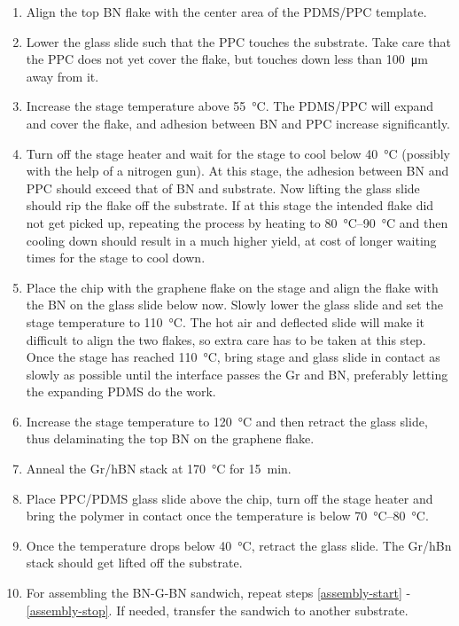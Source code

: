 \begin{enumerate}
	\item Align the top BN flake with the center area of the PDMS/PPC template.
	\item Lower the glass slide such that the PPC touches the substrate.
	Take care that the PPC does not yet cover the flake, but touches down less than \SI{100}{\micro\meter} away from it.
	\item Increase the stage temperature above \SI{55}{\celsius}.
	The PDMS/PPC will expand and cover the flake, and adhesion between BN and PPC increase significantly.
	\item Turn off the stage heater and wait for the stage to cool below \SI{40}{\celsius} (possibly with the help of a nitrogen gun).
	At this stage, the adhesion between BN and PPC should exceed that of BN and substrate.
	Now lifting the glass slide should rip the flake off the substrate.
	If at this stage the intended flake did not get picked up, repeating the process by heating to \SIrange{80}{90}{\celsius} and then cooling down should result in a much higher yield, at cost of longer waiting times for the stage to cool down.
	\item Place the chip with the graphene flake on the stage and align the flake with the BN on the glass slide below now.
	Slowly lower the glass slide and set the stage temperature to \SI{110}{\celsius}. 
	The hot air and deflected slide will make it difficult to align the two flakes, so extra care has to be taken at this step.
	Once the stage has reached \SI{110}{\celsius}, bring stage and glass slide in contact as slowly as possible until the interface passes the Gr and BN, preferably letting the expanding PDMS do the work.
	\label{assembly-start}
	\item Increase the stage temperature to \SI{120}{\celsius} and then retract the glass slide, thus delaminating the top BN on the graphene flake.
	\label{flake-delam}
	\item Anneal the Gr/hBN stack at \SI{170}{\celsius} for \SI{15}{\minute}.
	\item Place PPC/PDMS glass slide above the chip, turn off the stage heater and bring the polymer in contact once the temperature is below \SIrange{70}{80}{\celsius}.
	\item Once the temperature drops below \SI{40}{\celsius}, retract the glass slide.
	The Gr/hBn stack should get lifted off the substrate.
	\label{assembly-stop}
	\item For assembling the BN-G-BN sandwich, repeat steps \ref{assembly-start} - \ref{assembly-stop}.
	If needed, transfer the sandwich to another substrate.
\end{enumerate}


